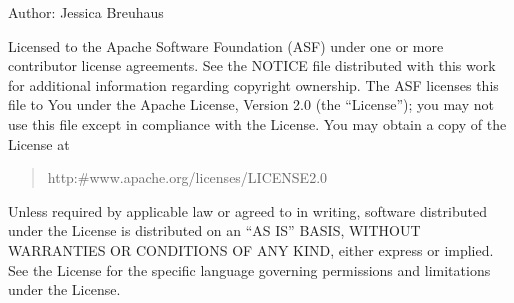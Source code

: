 \documentclass[letterpaper,10pt,english]{sphinxmanual}
\begin{document}
\sphinxAtStartPar
Author: Jessica Breuhaus
\begin{description}
\sphinxAtStartPar
Licensed to the Apache Software Foundation (ASF) under one or more
contributor license agreements.  See the NOTICE file distributed with
this work for additional information regarding copyright ownership.
The ASF licenses this file to You under the Apache License, Version 2.0
(the “License”); you may not use this file except in compliance with
the License.  You may obtain a copy of the License at
\begin{quote}

\sphinxAtStartPar
http:\#www.apache.org/licenses/LICENSE\sphinxhyphen{}2.0
\end{quote}

\sphinxAtStartPar
Unless required by applicable law or agreed to in writing, software
distributed under the License is distributed on an “AS IS” BASIS,
WITHOUT WARRANTIES OR CONDITIONS OF ANY KIND, either express or implied.
See the License for the specific language governing permissions and
limitations under the License.

\end{description}
\end{document}
